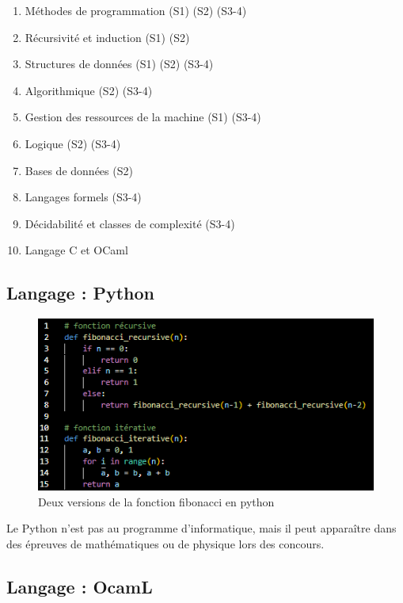 \documentclass{beamer}
\begin{document}
\begin{frame}
    \begin{enumerate}[label=\arabic*]
        \item Méthodes de programmation (S1) (S2) (S3-4)
        \item Récursivité et induction (S1) (S2)
        \item Structures de données (S1) (S2) (S3-4)
        \item Algorithmique (S2) (S3-4)
        \item Gestion des ressources de la machine (S1) (S3-4)
        \item Logique (S2) (S3-4)
        \item Bases de données (S2)
        \item Langages formels (S3-4)
        \item Décidabilité et classes de complexité (S3-4)
        \item Langage C et OCaml
    \end{enumerate}
\end{frame}

\subsection{Langage : Python}

\begin{frame}
    \begin{figure}
        \centering
        \includegraphics[width=0.9\linewidth]{ressource_diapo/fibo_python.PNG}
        \caption{Deux versions de la fonction fibonacci en python}
    \end{figure}
    Le Python n'est pas au programme d'informatique, mais il peut apparaître dans des épreuves de mathématiques ou de physique lors des concours.
\end{frame}

\subsection{Langage : OcamL}
\end{document}
